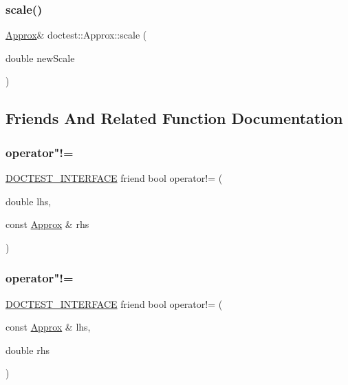 \subsubsection{\texorpdfstring{scale()}{scale()}}
{\footnotesize\ttfamily \mbox{\hyperlink{classdoctest_1_1_approx}{Approx}}\& doctest\+::\+Approx\+::scale (\begin{DoxyParamCaption}\item[{double}]{new\+Scale }\end{DoxyParamCaption})}



\subsection{Friends And Related Function Documentation}
\mbox{\label{classdoctest_1_1_approx_a44d4bbc575291095c884848887538233}} 
\subsubsection{\texorpdfstring{operator"!=}{operator!=}\hspace{0.1cm}{\footnotesize\ttfamily [1/2]}}
{\footnotesize\ttfamily \mbox{\hyperlink{doctest_8h_a9c16ffc635ec47f07797d21ede26b1a5}{D\+O\+C\+T\+E\+S\+T\+\_\+\+I\+N\+T\+E\+R\+F\+A\+CE}} friend bool operator!= (\begin{DoxyParamCaption}\item[{double}]{lhs,  }\item[{const \mbox{\hyperlink{classdoctest_1_1_approx}{Approx}} \&}]{rhs }\end{DoxyParamCaption})\hspace{0.3cm}{\ttfamily [friend]}}

\mbox{\label{classdoctest_1_1_approx_ae86972ba14656f422afdcc60cd2cdb08}} 
\subsubsection{\texorpdfstring{operator"!=}{operator!=}\hspace{0.1cm}{\footnotesize\ttfamily [2/2]}}
{\footnotesize\ttfamily \mbox{\hyperlink{doctest_8h_a9c16ffc635ec47f07797d21ede26b1a5}{D\+O\+C\+T\+E\+S\+T\+\_\+\+I\+N\+T\+E\+R\+F\+A\+CE}} friend bool operator!= (\begin{DoxyParamCaption}\item[{const \mbox{\hyperlink{classdoctest_1_1_approx}{Approx}} \&}]{lhs,  }\item[{double}]{rhs }\end{DoxyParamCaption})\hspace{0.3cm}{\ttfamily [friend]}}

